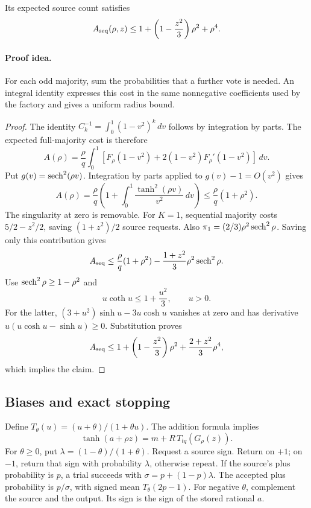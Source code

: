 \begin{lemma}\label{lem:arity}
Its expected source count satisfies
\begin{equation}\label{eq:sequentialarity}
A_{\rm seq}(\rho,z)\le
1+\left(1-\frac{z^2}{3}\right)\rho^2+\rho^4.
\end{equation}
\end{lemma}
\paragraph{Proof idea.}
For each odd majority, sum the probabilities that a further vote is needed.
An integral identity expresses this cost in the same nonnegative
coefficients used by the factory and gives a uniform radius bound.

\begin{proof}
The identity \(C_k^{-1}=\int_0^1(1-v^2)^k\,dv\) follows by
integration by parts. The expected full-majority cost is therefore
\[
A(\rho)=\frac{\rho}{q}\int_0^1
\left[F_\rho(1-v^2)+2(1-v^2)F_\rho'(1-v^2)\right]\,dv.
\]
Put \(g(v)=\operatorname{sech}^2(\rho v)\).
Integration by parts applied to \(g(v)-1=O(v^2)\) gives
\begin{equation}\label{eq:arityintegral}
A(\rho)=\frac{\rho}{q}\left(1+
\int_0^1\frac{\tanh^2(\rho v)}{v^2}\,dv\right)
\le\frac{\rho}{q}(1+\rho^2).
\end{equation}
The singularity at zero is removable.
For \(K=1\), sequential majority costs \(5/2-z^2/2\), saving
\((1+z^2)/2\) source requests. Also
\(\pi_1=(2/3)\rho^2\operatorname{sech}^2\rho\).
Saving only this contribution gives
\[
A_{\rm seq}\le\frac{\rho}{q}(1+\rho^2)
-\frac{1+z^2}{3}\rho^2\operatorname{sech}^2\rho.
\]
Use \(\operatorname{sech}^2\rho\ge1-\rho^2\) and
\begin{equation}\label{eq:xcothx}
u\coth u\le1+\frac{u^2}3,\qquad u>0.
\end{equation}
For the latter, \((3+u^2)\sinh u-3u\cosh u\) vanishes at zero
and has derivative \(u(u\cosh u-\sinh u)\ge0\).
Substitution proves
\[
A_{\rm seq}\le
1+\left(1-\frac{z^2}{3}\right)\rho^2
+\frac{2+z^2}{3}\rho^4,
\]
which implies the claim.
\end{proof}

\subsection{Biases and exact stopping}\label{sec:bias}

Define \(T_\theta(u)=(u+\theta)/(1+\theta u)\).
The addition formula implies
\begin{equation}\label{eq:biasidentity}
\tanh(a+\rho z)=m+R\,T_{tq}(G_\rho(z)).
\end{equation}
For \(\theta\ge0\), put
\(\lambda=(1-\theta)/(1+\theta)\).
Request a source sign. Return on \(+1\); on \(-1\), return that
sign with probability \(\lambda\), otherwise repeat.
If the source's plus probability is \(p\), a trial succeeds with
\(\sigma=p+(1-p)\lambda\).
The accepted plus probability is \(p/\sigma\), with signed mean
\(T_\theta(2p-1)\).
For negative \(\theta\), complement the source and the output.
Its sign is the sign of the stored rational \(a\).

